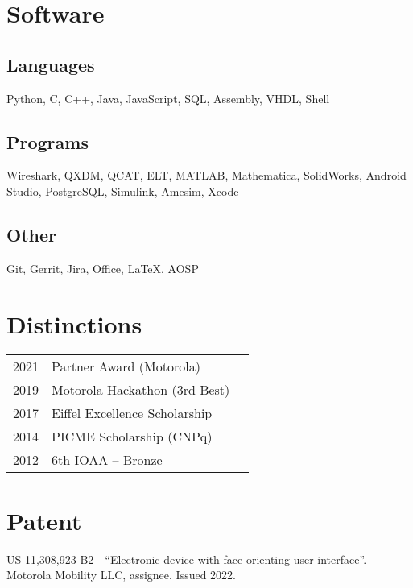 \documentclass[]{deedy-resume}
\begin{document}
\begin{minipage}[t]{0.33\textwidth}
\vspace{+1ex}

\section{Software}

\subsection{Languages}
Python, C, C++, Java, JavaScript, 
SQL, Assembly, VHDL, Shell 
\sectionsep

\subsection{Programs}
Wireshark, QXDM, QCAT, ELT, MATLAB, 
Mathematica, SolidWorks, Android Studio,
PostgreSQL, Simulink, Amesim, Xcode
\sectionsep

\subsection{Other}
Git, Gerrit, Jira, Office, LaTeX, AOSP

\vspace{+2ex}
\section{Distinctions} 
\begin{tabular}{rll}
2021         & Partner Award (Motorola)\\
2019         & Motorola Hackathon (3rd Best)\\
2017	     & Eiffel Excellence Scholarship\\
2014         & PICME Scholarship (CNPq)\\
2012	     & 6th IOAA -- Bronze\\
\end{tabular}
\sectionsep

\section{Patent}
\href{https://patents.google.com/patent/US11308923B2/}{US 11,308,923 B2} - ``Electronic device with face orienting user interface''. Motorola Mobility LLC, assignee. Issued 2022.
\sectionsep

%
%

\end{minipage} 
\end{document}
